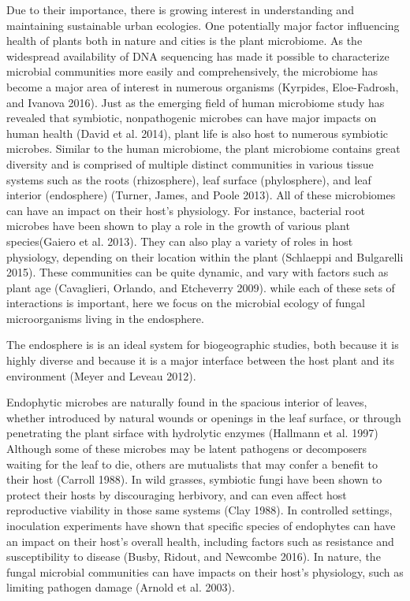 \documentclass[fleqn,10pt,lineno]{wlpeerj} %
\begin{document}
Due to their importance, there is growing interest in understanding and
maintaining sustainable urban ecologies. One potentially major factor
influencing health of plants both in nature and cities is the plant
microbiome. As the widespread availability of DNA sequencing has made it
possible to characterize microbial communities more easily and
comprehensively, the microbiome has become a major area of interest in
numerous organisms (Kyrpides, Eloe-Fadrosh, and Ivanova 2016). Just as
the emerging field of human microbiome study has revealed that
symbiotic, nonpathogenic microbes can have major impacts on human health
(David et al. 2014), plant life is also host to numerous symbiotic
microbes. Similar to the human microbiome, the plant microbiome contains
great diversity and is comprised of multiple distinct communities in
various tissue systems such as the roots (rhizosphere), leaf surface
(phylosphere), and leaf interior (endosphere) (Turner, James, and Poole
2013). All of these microbiomes can have an impact on their host's
physiology. For instance, bacterial root microbes have been shown to
play a role in the growth of various plant species(Gaiero et al. 2013).
They can also play a variety of roles in host physiology, depending on
their location within the plant (Schlaeppi and Bulgarelli 2015). These
communities can be quite dynamic, and vary with factors such as plant
age (Cavaglieri, Orlando, and Etcheverry 2009). while each of these sets
of interactions is important, here we focus on the microbial ecology of
fungal microorganisms living in the endosphere.

The endosphere is is an ideal system for biogeographic studies, both
because it is highly diverse and because it is a major interface between
the host plant and its environment (Meyer and Leveau 2012).

Endophytic microbes are naturally found in the spacious interior of
leaves, whether introduced by natural wounds or openings in the leaf
surface, or through penetrating the plant sirface with hydrolytic
enzymes (Hallmann et al. 1997) Although some of these microbes may be
latent pathogens or decomposers waiting for the leaf to die, others are
mutualists that may confer a benefit to their host (Carroll 1988). In
wild grasses, symbiotic fungi have been shown to protect their hosts by
discouraging herbivory, and can even affect host reproductive viability
in those same systems (Clay 1988). In controlled settings, inoculation
experiments have shown that specific species of endophytes can have an
impact on their host's overall health, including factors such as
resistance and susceptibility to disease (Busby, Ridout, and Newcombe
2016). In nature, the fungal microbial communities can have impacts on
their host's physiology, such as limiting pathogen damage (Arnold et al.
2003).
\end{document}
